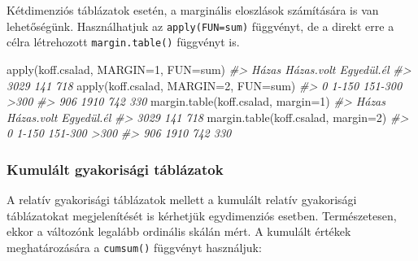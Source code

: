 \documentclass[
]{book}
\newenvironment{Shaded}{\begin{snugshade}}{\end{snugshade}}
\newcommand{\AttributeTok}[1]{\textcolor[rgb]{0.77,0.63,0.00}{#1}}
\newcommand{\CommentTok}[1]{\textcolor[rgb]{0.56,0.35,0.01}{\textit{#1}}}
\newcommand{\DecValTok}[1]{\textcolor[rgb]{0.00,0.00,0.81}{#1}}
\newcommand{\FunctionTok}[1]{\textcolor[rgb]{0.00,0.00,0.00}{#1}}
\newcommand{\NormalTok}[1]{#1}
\newcommand{\OtherTok}[1]{\textcolor[rgb]{0.56,0.35,0.01}{#1}}
\newcommand{\SpecialCharTok}[1]{\textcolor[rgb]{0.00,0.00,0.00}{#1}}
\newcommand{\StringTok}[1]{\textcolor[rgb]{0.31,0.60,0.02}{#1}}
\begin{document}
Kétdimenziós táblázatok esetén, a marginális eloszlások számítására is van lehetőségünk. Használhatjuk az \texttt{apply(FUN=sum)} függvényt, de a direkt erre a célra létrehozott \texttt{margin.table()} függvényt is.

\begin{Shaded}
\begin{Highlighting}[]
\FunctionTok{apply}\NormalTok{(koff.csalad, }\AttributeTok{MARGIN=}\DecValTok{1}\NormalTok{, }\AttributeTok{FUN=}\NormalTok{sum)}
\CommentTok{\#\textgreater{}      Házas Házas.volt Egyedül.él }
\CommentTok{\#\textgreater{}       3029        141        718}
\FunctionTok{apply}\NormalTok{(koff.csalad, }\AttributeTok{MARGIN=}\DecValTok{2}\NormalTok{, }\AttributeTok{FUN=}\NormalTok{sum)}
\CommentTok{\#\textgreater{}       0   1{-}150 151{-}300    \textgreater{}300 }
\CommentTok{\#\textgreater{}     906    1910     742     330}
\FunctionTok{margin.table}\NormalTok{(koff.csalad, }\AttributeTok{margin=}\DecValTok{1}\NormalTok{)}
\CommentTok{\#\textgreater{}      Házas Házas.volt Egyedül.él }
\CommentTok{\#\textgreater{}       3029        141        718}
\FunctionTok{margin.table}\NormalTok{(koff.csalad, }\AttributeTok{margin=}\DecValTok{2}\NormalTok{)}
\CommentTok{\#\textgreater{}       0   1{-}150 151{-}300    \textgreater{}300 }
\CommentTok{\#\textgreater{}     906    1910     742     330}
\end{Highlighting}
\end{Shaded}

\hypertarget{kumuluxe1lt-gyakorisuxe1gi-tuxe1bluxe1zatok}{%
\subsubsection{Kumulált gyakorisági táblázatok}\label{kumuluxe1lt-gyakorisuxe1gi-tuxe1bluxe1zatok}}

A relatív gyakorisági táblázatok mellett a kumulált relatív gyakorisági táblázatokat megjelenítését is kérhetjük egydimenziós esetben. Természetesen, ekkor a változónk legalább ordinális skálán mért. A kumulált értékek meghatározására a \texttt{cumsum()} függvényt használjuk:

\begin{Shaded}
\end{Shaded}
\end{document}
